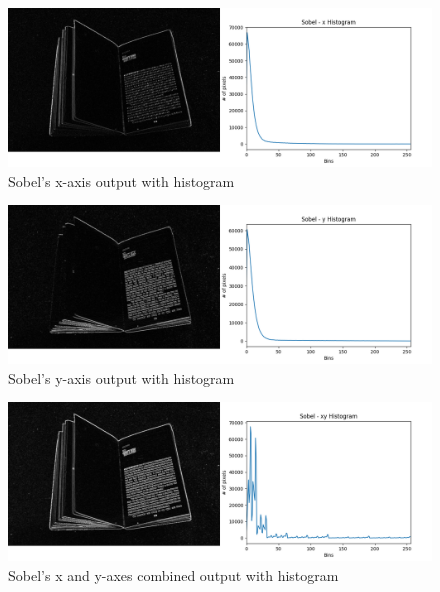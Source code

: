 \documentclass[BTech]{srmuthesis}
\begin{document}
\begin{figure}[h!]
    \centering
    \includegraphics[width=15cm\textwidth]{sobel_x_combined_hist}
    \caption{Sobel's x-axis output with histogram}
    \label{fig:Sobel's x-axis output with histogram}
\end{figure}
\begin{figure}[h!]
    \centering
    \includegraphics[width=15cm\textwidth]{sobel_y_combined_hist}
    \caption{Sobel's y-axis output with histogram}
    \label{fig:Sobel's y-axis with histogram}
\end{figure}
\begin{figure}[h!]
    \centering
    \includegraphics[width=15cm\textwidth]{sobel_xy_combined_hist}
    \caption{Sobel's x and y-axes combined output with histogram}
    \label{fig:Sobel's x and y-axes combined output with histogram}
\end{figure}
\end{document}
